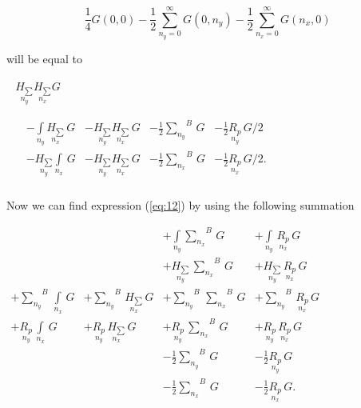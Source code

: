 \documentclass[twoside, 10pt]{article}
\begin{document}
\begin{multicols}{2}
    

    \[
\frac{1}{4}G\left(0, 0\right)
- \frac{1}{2}\sum\limits_{n_y=0}^{\infty}{G\left(0, n_y\right)}
- \frac{1}{2}\sum\limits_{n_x=0}^{\infty}{G\left(n_x, 0\right)}
\]

    will be equal to

\noindent
\(\begin{array}{l}
    \begin{array}{l}
  \underset{n_y}{H_{\sum}} \underset{n_x}{H_{\sum}} G \\
\end{array} \\
\begin{array}{rrrrr}
  \, &  - \int\limits_{n_y}^{} \underset{n_x}{H_{\sum}}\,G &  - \underset{n_y}{H_{\sum}} \underset{n_x}{H_{\sum}}\,G &  - \frac{1}{2}{\sum\limits_{n_y}^{}}^{B}\,G &  - \frac{1}{2}\underset{n_y}{R_{p}}\,G/2 \\
  \,&  - \underset{n_y}{H_{\sum}}\int\limits_{n_x}^{} \,G &  - \underset{n_y}{H_{\sum}} \underset{n_x}{H_{\sum}}\,G &  - \frac{1}{2}{\sum\limits_{n_x}^{}}^{B}\,G &  - \frac{1}{2}\underset{n_x}{R_{p}}\,G/2. \\
\end{array}
\end{array}\)

    Now we can find expression (\ref{eq:12}) by using the following summation




\noindent
    \(\begin{array}{llll}  \,&  \,&  + \int\limits_{n_y}^{}{\sum\limits_{n_x}^{}}^{B}\,G &  + \int\limits_{n_y}^{}\,\underset{n_x}{R_{p}}\,G \\  \,&  \,&  + \underset{n_y}{H_{\sum}}\,{\sum\limits_{n_x}^{}}^{B}\,G &  + \underset{n_y}{H_{\sum}}\,\underset{n_x}{R_{p}}\,G \\  + {\sum\limits_{n_y}^{}}^{B}\,\int\limits_{n_x}^{}\,G &  + {\sum\limits_{n_y}^{}}^{B}\,\underset{n_x}{H_{\sum}}\,G &  + {\sum\limits_{n_y}^{}}^{B}\,{\sum\limits_{n_x}^{}}^{B}\,G &  + {\sum\limits_{n_y}^{}}^{B}\,\underset{n_x}{R_{p}}\,G \\  + \underset{n_y}{R_{p}}\,\int\limits_{n_x}^{}\,G &  + \underset{n_y}{R_{p}}\,\underset{n_x}{H_{\sum}}\,G &  + \underset{n_y}{R_{p}}\,{\sum\limits_{n_x}^{}}^{B}\,G &  + \underset{n_y}{R_{p}}\,\underset{n_x}{R_{p}}\,G \\  \,&  \,&  - \frac{1}{2}{\sum\limits_{n_y}^{}}^{B}\,G &  - \frac{1}{2}\underset{n_y}{R_{p}}\,G \\  \,&  \,&  - \frac{1}{2}{\sum\limits_{n_x}^{}}^{B}\,G &  - \frac{1}{2}\underset{n_x}{R_{p}}\,G. \\ \end{array}\)


\end{multicols}
\end{document}
